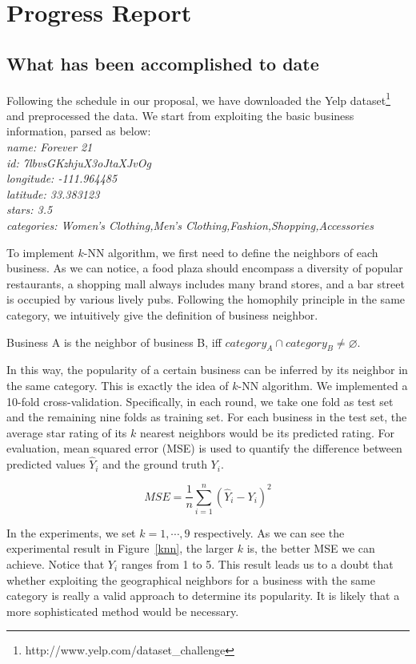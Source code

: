 \section*{Progress Report}
\subsection{What has been accomplished to date}

Following the schedule in our proposal, we have downloaded the Yelp dataset\footnote{http://www.yelp.com/dataset\_challenge} and preprocessed the data. We start from exploiting the basic business information, parsed as below:\\
\emph{
\small
\indent name: Forever 21\\
\indent id: 7lbvsGKzhjuX3oJtaXJvOg\\
\indent longitude: -111.964485\\
\indent latitude: 33.383123\\
\indent stars: 3.5\\
\indent categories: Women's Clothing,Men's Clothing,Fashion,Shopping,Accessories
}

To implement $k$-NN algorithm, we first need to define the neighbors of each business. As we can notice, a food plaza should encompass a diversity of popular restaurants, a shopping mall always includes many brand stores, and a bar street is occupied by various lively pubs. Following the homophily principle in the same category, we intuitively give the definition of business neighbor.

\begin{defn}
Business A is the neighbor of business B, iff $category_A \cap category_B \neq \varnothing$.
\end{defn}

In this way, the popularity of a certain business can be inferred by its neighbor in the same category. This is exactly the idea of $k$-NN algorithm. We implemented a 10-fold cross-validation. Specifically, in each round, we take one fold as test set and the remaining nine folds as training set. For each business in the test set, the average star rating of its $k$ nearest neighbors would be its predicted rating. For evaluation, mean squared error (MSE) is used to quantify the difference between predicted values $\hat{Y}_i$ and the ground truth $Y_i$.

$$MSE=\frac{1}{n}\sum_{i=1}^{n}(\hat{Y}_i-Y_i)^2$$

In the experiments, we set $k=1,\cdots,9$ respectively. As we can see the experimental result in Figure~\ref{knn}, the larger $k$ is, the better MSE we can achieve. Notice that $Y_i$ ranges from 1 to 5. This result leads us to a doubt that whether exploiting the geographical neighbors for a business with the same category is really a valid approach to determine its popularity. It is likely that a more sophisticated method would be necessary.

